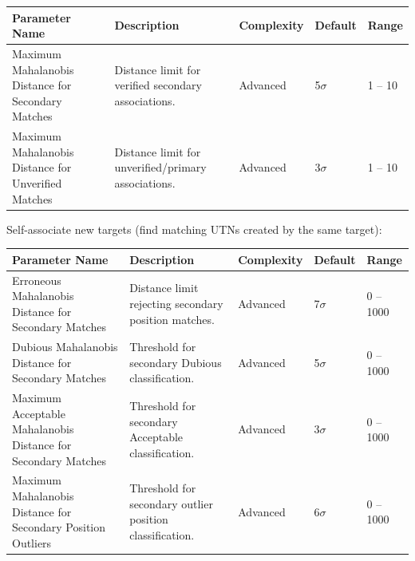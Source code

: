 \begin{table}[H]
    \centering
    \footnotesize
    \hspace*{-1.5cm}
    \begin{tabular}{|p{4.5cm}|p{6.5cm}|l|l|l|}
    \hline
    \textbf{Parameter Name} & \textbf{Description} & \textbf{Complexity} & \textbf{Default} & \textbf{Range} \\ \hline
    Maximum Mahalanobis Distance for Secondary Matches & Distance limit for verified secondary associations. & Advanced & 5$\sigma$ & 1 -- 10 \\ \hline
    Maximum Mahalanobis Distance for Unverified Matches & Distance limit for unverified/primary associations. & Advanced & 3$\sigma$ & 1 -- 10 \\ \hline
    \end{tabular}
\end{table}

Self-associate new targets (find matching UTNs created by the same target):
\begin{table}[H]
    \centering
    \footnotesize
    \hspace*{-1.5cm}
    \begin{tabular}{|p{4.5cm}|p{6.5cm}|l|l|l|}
    \hline
    \textbf{Parameter Name} & \textbf{Description} & \textbf{Complexity} & \textbf{Default} & \textbf{Range} \\ \hline
    Erroneous Mahalanobis Distance for Secondary Matches & Distance limit rejecting secondary position matches. & Advanced & 7$\sigma$ & 0 -- 1000 \\ \hline
    Dubious Mahalanobis Distance for Secondary Matches & Threshold for secondary Dubious classification. & Advanced & 5$\sigma$ & 0 -- 1000 \\ \hline
    Maximum Acceptable Mahalanobis Distance for Secondary Matches & Threshold for secondary Acceptable classification. & Advanced & 3$\sigma$ & 0 -- 1000 \\ \hline
    Maximum Mahalanobis Distance for Secondary Position Outliers & Threshold for secondary outlier position classification. & Advanced & 6$\sigma$ & 0 -- 1000 \\ \hline
    \end{tabular}
\end{table}

